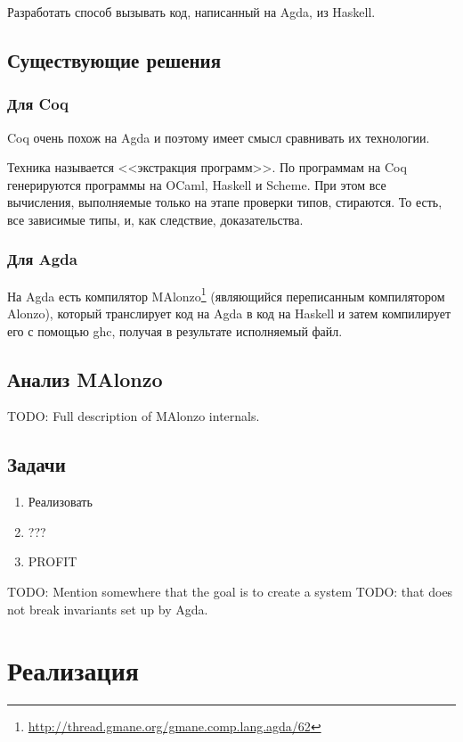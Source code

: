 Разработать способ вызывать код, написанный на Agda, из Haskell.

\subsection{Существующие решения}

\subsubsection{Для Coq}

Coq очень похож на Agda и поэтому имеет смысл сравнивать их технологии.

Техника называется <<экстракция программ>>\cite{Let02}.
По программам на Coq генерируются программы на OCaml, Haskell и Scheme.
При этом все вычисления, выполняемые только на этапе проверки типов, стираются.
То есть, все зависимые типы, и, как следствие, доказательства.

\subsubsection{Для Agda}

На Agda есть компилятор
MAlonzo\footnote{\url{http://thread.gmane.org/gmane.comp.lang.agda/62}}
(являющийся переписанным компилятором Alonzo\cite{Ben07}), который транслирует
код на Agda в код на Haskell и затем компилирует его с помощью ghc, получая в
результате исполняемый файл.

\subsection{Анализ MAlonzo}

TODO: Full description of MAlonzo internals.

\subsection{Задачи}

\begin{enumerate}
\item Реализовать
\item ???
\item PROFIT
\end{enumerate}

TODO: Mention somewhere that the goal is to create a system
TODO: that does not break invariants set up by Agda.

\newpage
\section{Реализация}

